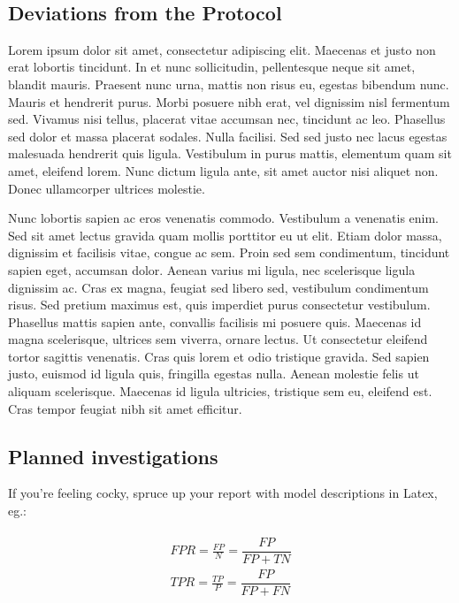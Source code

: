 \documentclass[
]{article}
\begin{document}
\(~\)\\

\hypertarget{deviations-from-the-protocol}{%
\subsection{Deviations from the
Protocol}\label{deviations-from-the-protocol}}

Lorem ipsum dolor sit amet, consectetur adipiscing elit. Maecenas et
justo non erat lobortis tincidunt. In et nunc sollicitudin, pellentesque
neque sit amet, blandit mauris. Praesent nunc urna, mattis non risus eu,
egestas bibendum nunc. Mauris et hendrerit purus. Morbi posuere nibh
erat, vel dignissim nisl fermentum sed. Vivamus nisi tellus, placerat
vitae accumsan nec, tincidunt ac leo. Phasellus sed dolor et massa
placerat sodales. Nulla facilisi. Sed sed justo nec lacus egestas
malesuada hendrerit quis ligula. Vestibulum in purus mattis, elementum
quam sit amet, eleifend lorem. Nunc dictum ligula ante, sit amet auctor
nisi aliquet non. Donec ullamcorper ultrices molestie.

Nunc lobortis sapien ac eros venenatis commodo. Vestibulum a venenatis
enim. Sed sit amet lectus gravida quam mollis porttitor eu ut elit.
Etiam dolor massa, dignissim et facilisis vitae, congue ac sem. Proin
sed sem condimentum, tincidunt sapien eget, accumsan dolor. Aenean
varius mi ligula, nec scelerisque ligula dignissim ac. Cras ex magna,
feugiat sed libero sed, vestibulum condimentum risus. Sed pretium
maximus est, quis imperdiet purus consectetur vestibulum. Phasellus
mattis sapien ante, convallis facilisis mi posuere quis. Maecenas id
magna scelerisque, ultrices sem viverra, ornare lectus. Ut consectetur
eleifend tortor sagittis venenatis. Cras quis lorem et odio tristique
gravida. Sed sapien justo, euismod id ligula quis, fringilla egestas
nulla. Aenean molestie felis ut aliquam scelerisque. Maecenas id ligula
ultricies, tristique sem eu, eleifend est. Cras tempor feugiat nibh sit
amet efficitur.

\hypertarget{planned-investigations}{%
\subsection{Planned investigations}\label{planned-investigations}}

If you're feeling cocky, spruce up your report with model descriptions
in Latex, eg.:

\begin{align}
\begin{aligned}
FPR = \frac{FP}{N} = \dfrac{FP}{FP+TN}\\
TPR = \frac{TP}{P} = \dfrac{FP}{FP+FN}
\end{aligned}
\end{align}
\end{document}

